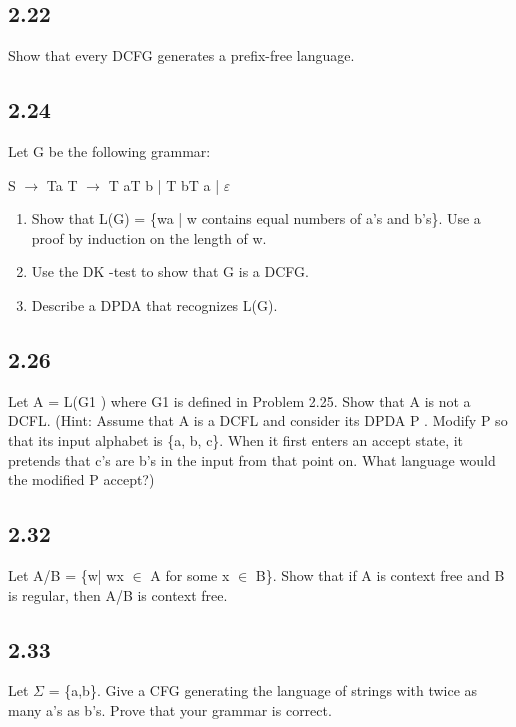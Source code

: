 \subsection*{2.22}

Show that every DCFG generates a prefix-free language.


\subsection*{2.24}

Let G be the following grammar:

S $\to$ Ta T $\to$ T aT b | T bT a | $\varepsilon$

\begin{enumerate}[label=(\alph*), leftmargin=2.5em]

\item Show that L(G) = \{wa | w contains equal numbers of a's and b's\}. Use a proof by induction on the length of w.

\item Use the DK -test to show that G is a DCFG.

\item Describe a DPDA that recognizes L(G).

\end{enumerate}


\subsection*{2.26}

Let A = L(G1 ) where G1 is defined in Problem 2.25. Show that A is not a DCFL. (Hint: Assume that A is a DCFL and consider its DPDA P . Modify P so that its input alphabet is \{a, b, c\}. When it first enters an accept state, it pretends that c's are b's in the input from that point on. What language would the modified P accept?)


\subsection*{2.32}

Let A/B = \{w| wx $\in$ A for some x $\in$ B\}. Show that if A is context free and B is regular, then A/B is context free.


\subsection*{2.33}

Let $\Sigma$ = \{a,b\}. Give a CFG generating the language of strings with twice as many a's as b's. Prove that your grammar is correct.


